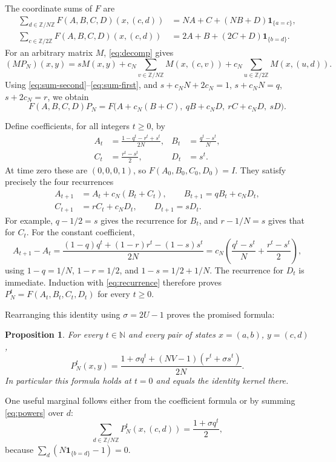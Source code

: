 \documentclass[11pt,a4paper]{article}
\newtheorem{proposition}[theorem]{Proposition}
\theoremstyle{definition}
\theoremstyle{remark}
\newcommand{\N}{\mathbb N}
\newcommand{\Z}{\mathbb Z}
\newcommand{\ind}{\mathbf 1}
\begin{document}
The coordinate sums of $F$ are
\begin{align}
\sum_{d\in\Z/N\Z}F(A,B,C,D)(x,(c,d))
  &=NA+C+(NB+D)\ind_{\{a=c\}},\label{eq:sum-second}\\
\sum_{c\in\Z/2\Z}F(A,B,C,D)(x,(c,d))
  &=2A+B+(2C+D)\ind_{\{b=d\}}.\label{eq:sum-first}
\end{align}
For an arbitrary matrix $M$, \eqref{eq:decomp} gives
\[
(MP_N)(x,y)=sM(x,y)
+c_N\sum_{v\in\Z/N\Z}M(x,(c,v))
+c_N\sum_{u\in\Z/2\Z}M(x,(u,d)).
\]
Using \eqref{eq:sum-second}--\eqref{eq:sum-first}, and
$s+c_NN+2c_N=1$, $s+c_NN=q$, $s+2c_N=r$, we obtain
\begin{equation}\label{eq:recurrence}
F(A,B,C,D)P_N
=F\bigl(A+c_N(B+C),\ qB+c_ND,\ rC+c_ND,\ sD\bigr).
\end{equation}

Define coefficients, for all integers $t\ge0$, by
\begin{align*}
A_t&=\frac{1-q^t-r^t+s^t}{2N},&
B_t&=\frac{q^t-s^t}{N},\\
C_t&=\frac{r^t-s^t}{2},&
D_t&=s^t.
\end{align*}
At time zero these are $(0,0,0,1)$, so $F(A_0,B_0,C_0,D_0)=I$.
They satisfy precisely the four recurrences
\[
\begin{split}
A_{t+1}&=A_t+c_N(B_t+C_t),\qquad
B_{t+1}=qB_t+c_ND_t,\\
C_{t+1}&=rC_t+c_ND_t,\qquad
D_{t+1}=sD_t.
\end{split}
\]
For example, $q-1/2=s$ gives the recurrence for $B_t$, and
$r-1/N=s$ gives that for $C_t$. For the constant coefficient,
\[
A_{t+1}-A_t
=\frac{(1-q)q^t+(1-r)r^t-(1-s)s^t}{2N}
=c_N\left(\frac{q^t-s^t}{N}+\frac{r^t-s^t}{2}\right),
\]
using $1-q=1/N$, $1-r=1/2$, and $1-s=1/2+1/N$.
The recurrence for $D_t$ is immediate.
Induction with \eqref{eq:recurrence} therefore proves
$P_N^t=F(A_t,B_t,C_t,D_t)$ for every $t\ge0$.

Rearranging this identity using $\sigma=2U-1$ proves the promised formula:
\begin{proposition}\label{prop:powers}
For every $t\in\N$ and every pair of states $x=(a,b)$, $y=(c,d)$,
\begin{equation}\label{eq:powers}
P_N^t(x,y)
=\frac{1+\sigma q^t+(NV-1)(r^t+\sigma s^t)}{2N}.
\end{equation}
In particular this formula holds at $t=0$ and equals the identity kernel
there.
\end{proposition}

One useful marginal follows either from the coefficient formula or by
summing \eqref{eq:powers} over $d$:
\begin{equation}\label{eq:blockmass}
\sum_{d\in\Z/N\Z}P_N^t(x,(c,d))
=\frac{1+\sigma q^t}{2},
\end{equation}
because $\sum_d(N\ind_{\{b=d\}}-1)=0$.
\end{document}
